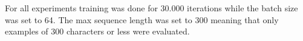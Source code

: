  For all experiments training was done for 30.000 iterations while the batch size was set to 64. The max sequence length was set to 300 meaning that only examples of 300 characters or less were evaluated.
